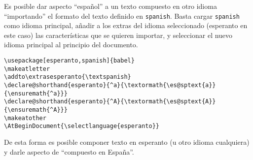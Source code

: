 Es posible dar aspecto ``español'' a un texto compuesto en otro idioma ``importando'' el formato del texto definido en \verb|spanish|. Basta cargar \verb|spanish| como idioma principal, añadir a los extras del idioma seleccionado (esperanto en este caso) las características que se quieren importar, y seleccionar el nuevo idioma principal al principio del documento.

\begin{verbatim}
\usepackage[esperanto,spanish]{babel}
\makeatletter
\addto\extrasesperanto{\textspanish}
\declare@shorthand{esperanto}{^a}{\textormath{\es@sptext{a}}{\ensuremath{^a}}}
\declare@shorthand{esperanto}{^A}{\textormath{\es@sptext{A}}{\ensuremath{^A}}}
\makeatother
\AtBeginDocument{\selectlanguage{esperanto}}
\end{verbatim}

De esta forma es posible componer texto en esperanto (u otro idioma cualquiera) y darle aspecto de ``compuesto en España''.

